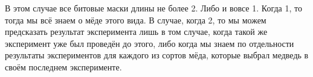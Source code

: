 \begin{enumerate}
\begin{enumerate}
		В этом случае все битовые маски длины не более 2. Либо и вовсе 1. Когда 1, то тогда мы всё знаем о мёде 
		этого вида. В случае, когда 2, то мы можем предсказать результат эксперимента лишь в том случае, когда 
		такой же эксперимент уже был проведён до этого, либо когда мы знаем по отдельности результаты 
		экспериментов для каждого из сортов мёда, которые выбрал медведь в своём последнем эксперименте.
	\end{enumerate}
\end{enumerate}
